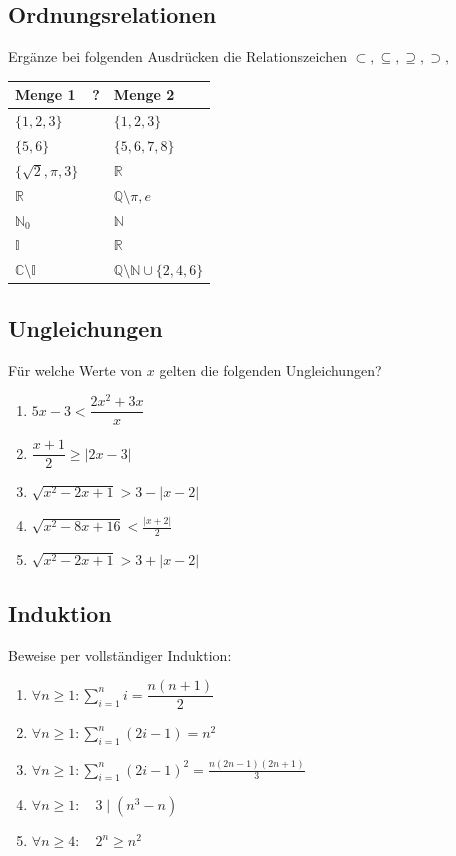 \documentclass[11pt, a4paper]{article}
\newcommand{\abs}[1]{\left\lvert#1\right\rvert}
\begin{document}
\subsection{Ordnungsrelationen}
Ergänze bei folgenden Ausdrücken die Relationszeichen $\subset, \subseteq, \supseteq, \supset,$ \\
\begin{tabular}{|l|c|l|}
	\hline
	Menge 1 & \hspace{3mm} ? \hspace{3mm} & Menge 2 \\ \hline
	$\{1,2,3\}$ & & $\{1,2,3\}$ \\
	$\{5,6\}$ & & $\{5,6,7,8\}$ \\
	$\{\sqrt{2}, \pi, 3\}$ & & $\mathbb{R}$ \\
	$\mathbb{R}$ & & $\mathbb{Q} \setminus {\pi, e}$ \\
	$\mathbb{N}_0$ & & $\mathbb{N}$ \\
	$\mathbb{I}$ & & $\mathbb{R}$ \\
	$\mathbb{C} \setminus \mathbb{I}$ & & $\mathbb{Q} \setminus \mathbb{N} \cup \{2,4,6\}$ \\ \hline
\end{tabular}

\subsection{Ungleichungen}
Für welche Werte von $x$ gelten die folgenden Ungleichungen?
\begin{enumerate}
	\item $5x-3 < \dfrac{2x^2+3x}{x}$
	\item $\dfrac{x+1}{2} \geq \abs{2x-3}$
	\item $\sqrt{x^2-2x+1} > 3 - |x-2|$
	\item $\sqrt{x^2-8x+16} < \frac{\abs{x+2}}{2}$
	\item $\sqrt{x^2-2x+1} > 3 + |x-2|$
\end{enumerate}

\subsection{Induktion}
Beweise per vollständiger Induktion:
\begin{enumerate}
	\item $\forall n \geq 1 : \sum_{i=1}^n i = \dfrac{n(n+1)}{2}$
	\item $\forall n \geq 1 : \sum_{i=1}^n (2i-1) = n^2$
	\item $\forall n \geq 1 : \sum_{i=1}^n (2i-1)^2 = \frac{n (2n-1)(2n+1)}{3}$
	\item $\forall n \geq 1 : \quad 3 \mid (n^3 - n)$
	\item $\forall n \geq 4 : \quad 2^n \geq n^2$
\end{enumerate}
\end{document}
